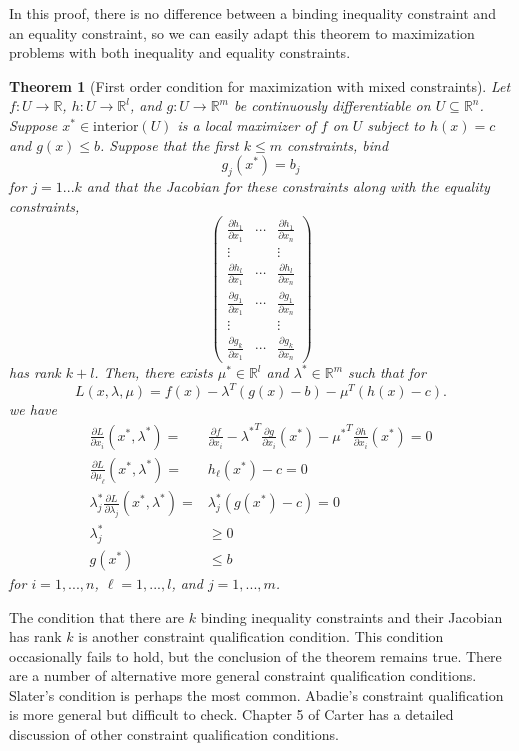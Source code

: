 \documentclass[12pt,reqno]{amsart}
\newtheorem{theorem}{Theorem}[section]
\theoremstyle{definition}
\def\R{\mathbb{R}}
\renewcommand{\to}{{\rightarrow}}
\begin{document}
In this proof, there is no difference between a binding
inequality constraint and an equality constraint, so we can easily
adapt this theorem to maximization problems with both inequality and
equality constraints.

\begin{theorem}[First order condition for maximization with mixed constraints] \label{thm:mcon}
  Let $f:U \to \R$, $h:U \to \R^l$, and $g: U \to \R^m$ be
  continuously differentiable on $U \subseteq \R^n$. Suppose $x^* \in 
  \mathrm{interior}(U)$ is a local maximizer of $f$ on $U$ subject to 
  $h(x) = c$ and $g(x) \leq b$. Suppose that the first $k \leq m$
  constraints, bind 
  \[ g_j(x^*) = b_j \]
  for $j = 1 ... k$ and that the Jacobian for these constraints along
  with the equality constraints,
  \[ \begin{pmatrix} 
    \frac{\partial h_1}{\partial x_1} &  \cdots &\frac{\partial
      h_1}{\partial x_n}  \\
    \vdots & & \vdots \\
    \frac{\partial h_l}{\partial x_1} &  \cdots &\frac{\partial
      h_l}{\partial x_n}  \\    
    \frac{\partial g_1}{\partial x_1} &  \cdots &\frac{\partial g_1}{\partial x_n}  \\
    \vdots & & \vdots \\
    \frac{\partial g_k}{\partial x_1} &  \cdots &\frac{\partial
      g_k}{\partial x_n}  
  \end{pmatrix}
  \]
  has rank $k+l$. Then, there exists
  $\mu^* \in \R^l$ and $\lambda^* \in \R^m$ such that for 
  \[ L(x,\lambda,\mu) = f(x) - \lambda^T (g(x) - b) - \mu^T(h(x) - c). \]
  we have
  \begin{align*}
    \frac{\partial L}{\partial x_i}(x^*,\lambda^*) = & \frac{\partial
      f}{\partial x_i} - {\lambda^*}^T \frac{\partial g}{\partial
      x_i}(x^*) - {\mu^*}^T \frac{\partial h}{\partial x_i}(x^*)= 0 \\
    \frac{\partial L}{\partial \mu_\ell}(x^*,\lambda^*) = & h_\ell(x^*) - c = 0 \\
    \lambda_j^* \frac{\partial L}{\partial \lambda_j}(x^*,\lambda^*) =
    & \lambda_j^* \left(g(x^*) - c \right)= 0 \\
    \lambda_j^* & \geq 0 \\
    g(x^*) & \leq b
  \end{align*}
  for $i = 1, ..., n$, $\ell = 1,..., l$, and $j=1,...,m$.
\end{theorem}
The condition that there are $k$ binding inequality constraints and
their Jacobian has rank $k$ is another constraint qualification
condition. This condition occasionally fails to hold, but the
conclusion of the theorem remains true. There are a number of
alternative more general constraint qualification conditions. Slater's
condition is perhaps the most common. Abadie's constraint
qualification is more general but difficult to check. Chapter 5 of
Carter has a detailed discussion of other constraint qualification
conditions.
\end{document}

